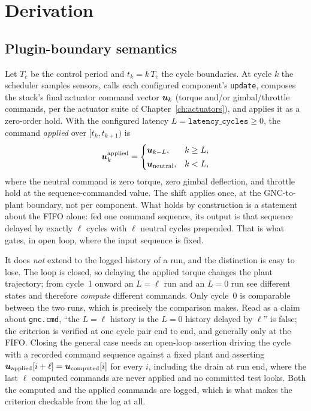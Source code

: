 \section{Derivation}
\label{sec:gnc:derivation}

\subsection{Plugin-boundary semantics}
\label{sec:gnc:interface}

Let $T_c$ be the control period and $t_k = k\,T_c$ the cycle
boundaries. At cycle $k$ the scheduler samples sensors, calls each
configured component's \texttt{update}, composes the stack's final
actuator command vector $\bm{u}_k$ (torque and/or gimbal/throttle
commands, per the actuator suite of Chapter~\ref{ch:actuators}), and
applies it as a zero-order hold. With the configured latency $L =
\texttt{latency\_cycles} \ge 0$, the command \emph{applied} over
$[t_k, t_{k+1})$ is
\begin{equation}
  \bm{u}^{\mathrm{applied}}_k =
  \begin{cases}
    \bm{u}_{k-L}, & k \ge L,\\[2pt]
    \bm{u}_{\mathrm{neutral}}, & k < L,
  \end{cases}
  \label{eq:gnc:latency}
\end{equation}
where the neutral command is zero torque, zero gimbal deflection, and
throttle hold at the sequence-commanded value. The shift applies once, at
the GNC-to-plant boundary, not per component. What holds by construction is
a statement about the FIFO alone: fed one command sequence, its output is
that sequence delayed by exactly $\ell$ cycles with $\ell$ neutral cycles
prepended. That is what  gates, in open
loop, where the input sequence is fixed.

It does \emph{not} extend to the logged history of a run, and the
distinction is easy to lose. The loop is closed, so delaying the applied
torque changes the plant trajectory; from cycle~1 onward an $L = \ell$ run
and an $L = 0$ run see different states and therefore \emph{compute}
different commands. Only cycle~0 is comparable between the two runs, which
is precisely the comparison
 makes. Read as a claim
about \texttt{gnc.cmd}, ``the $L = \ell$ history is the $L = 0$ history
delayed by $\ell$'' is false; the criterion is verified at one cycle pair
end to end, and generally only at the FIFO. Closing the general case needs
an open-loop assertion driving the cycle with a recorded command sequence
against a fixed plant and asserting
$\bm{u}_{\mathrm{applied}}[i + \ell] = \bm{u}_{\mathrm{computed}}[i]$ for
every $i$, including the drain at run end, where the last $\ell$ computed
commands are never applied and no committed test looks. Both the computed
and the applied commands are logged, which is what makes the criterion
checkable from the log at all.


